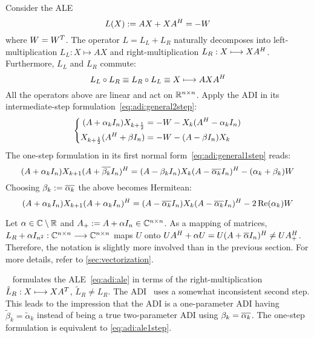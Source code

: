 Consider the \ac{ALE}
\begin{equation}
\label{eq:adi:ale}
  L(X) := AX + XA^H = -W
\end{equation}
where $W = W^T$.
The \Lyapunov operator $L = L_L + L_R$ naturally decomposes into
left-multiplication $L_L : X \mapsto AX$ and
right-multiplication $L_R : X \longmapsto XA^H$.
Furthermore, $L_L$ and $L_R$ commute:
\begin{equation*}
  L_L \circ L_R \equiv L_R \circ L_L \equiv X \longmapsto AXA^H
\end{equation*}
All the operators above are linear and act on $\mathbb{R}^{n\times n}$.
Apply the \ac{ADI} in its intermediate-step formulation~\eqref{eq:adi:general2step}:
\begin{equation}
  \left\{
  \begin{aligned}
    (A + \alpha_k I_n) X_{k+\frac{1}{2}} &= -W - X_k (A^H - \alpha_k I_n) \\
    X_{k+\frac{1}{2}} (A^H + \beta I_n) &= -W - (A - \beta I_n) X_k
  \end{aligned}
  \right.
\end{equation}
The one-step formulation in its first normal form~\eqref{eq:adi:general1step} reads:
\begin{equation}
  (A + \alpha_k I_n)
  X_{k+1}
  (A + \conj{\beta_k} I_n)^\HT
  =
  (A - \beta_k I_n)
  X_k
  (A - \conj{\alpha_k} I_n)^\HT
  - (\alpha_k + \beta_k)
  W
\end{equation}
Choosing $\beta_k := \conj{\alpha_k}$
the above becomes Hermitean:
\begin{equation}
\label{eq:adi:ale1step}
  (A + \alpha_k I_n)
  X_{k+1}
  (A + \alpha_k I_n)^\HT
  =
  (A - \conj{\alpha_k} I_n)
  X_k
  (A - \conj{\alpha_k} I_n)^\HT
  - 2\Re(\alpha_k)
  W
\end{equation}

\begin{remark}
  Let $\alpha\in\mathbb{C}\setminus\mathbb{R}$ and $A_+ := A+\alpha I_n \in\mathbb{C}^{n\times n}$.
  As a mapping of matrices,
  $L_R + \alpha I_{n^2} : \mathbb{C}^{n\times n} \longrightarrow \mathbb{C}^{n\times n}$ maps $U$ onto
  $
    U A^\HT + \alpha U =
    U(A+\conj{\alpha} I_n)^\HT \neq
    U A_+^\HT
  $.
  Therefore, the notation is slightly more involved than in the previous section.
  For more details, refer to \autoref{sec:vectorization}.
\end{remark}

\begin{remark}
  \citeauthor{Lang2017}~\cite{Lang2017} formulates the \ac{ALE}~\eqref{eq:adi:ale} in terms of the
  right-multiplication $\tilde L_R :X \longmapsto XA^T$, $\tilde L_R \neq L_R$.
  The ADI~\cite[Equation~(2.23)]{Lang2017} uses a somewhat inconsistent second step.
  This leads to the impression that the ADI is a one-parameter ADI having $\tilde\beta_k = \tilde\alpha_k$
  instead of being a true two-parameter ADI using $\beta_k = \conj{\alpha_k}$.
  The one-step formulation \cite[Equation~(2.24)]{Lang2017} is equivalent to \eqref{eq:adi:ale1step}.
\end{remark}

